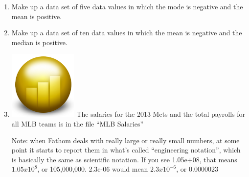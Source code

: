 \documentclass[12pt]{article}
\theoremstyle{plain}     %
\begin{document}
\begin{enumerate}
		
		

\newpage

	\item Make up a data set of five data values in which the mode is negative and the mean is positive.


	\item Make up a data set of ten data values in which the mean is negative and the median is positive.


	\item \includegraphics[scale=.1]{fathom.png} The salaries for the 2013 Mets and the total payrolls for all MLB teams is in the file “MLB Salaries”

Note: when Fathom deals with really large or really small numbers, at some point it starts to report them in what’s called “engineering notation”, which is basically the same as scientific notation.  If you see 1.05e+08, that means $1.05 x 10^8$, or 105,000,000.  2.3e-06 would mean $2.3 x 10^{-6}$, or 0.0000023


\end{enumerate}
\end{document}

